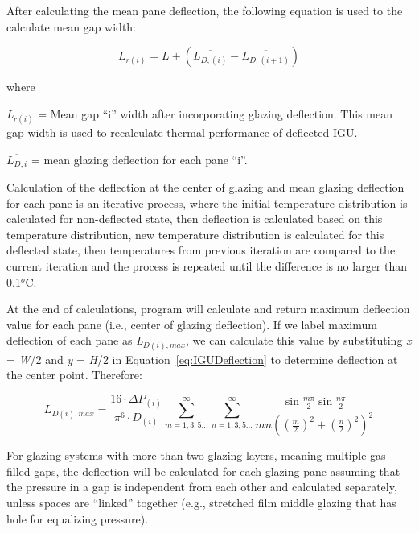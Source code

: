 After calculating the mean pane deflection, the following equation is used to the calculate mean gap width:

\begin{equation}
{L_{r\left( i \right)}} = L + \left( {\overline {{L_{D,\left( i \right)}}}  - \overline {{L_{D,\left( {i + 1} \right)}}} } \right)
\label{eq:IGUMeanPaneDeflection}
\end{equation}

where

\emph{L\(_{r(i)}\)} = Mean gap ``i'' width after incorporating glazing deflection. This mean gap width is used to recalculate thermal performance of deflected IGU.

\(\overline {{L_{D,i}}}\) = mean glazing deflection for each pane ``i''.

Calculation of the deflection at the center of glazing and mean glazing deflection for each pane is an iterative process, where the initial temperature distribution is calculated for non-deflected state, then deflection is calculated based on this temperature distribution, new temperature distribution is calculated for this deflected state, then temperatures from previous iteration are compared to the current iteration and the process is repeated until the difference is no larger than 0.1\(^{o}\)C.

At the end of calculations, program will calculate and return maximum deflection value for each pane (i.e., center of glazing deflection). If we label maximum deflection of each pane as \emph{L\(_{D(i),max}\)}, we can calculate this value by substituting \emph{x} = \emph{W}/2 and \emph{y} = \emph{H}/2 in Equation~\ref{eq:IGUDeflection} to determine deflection at the center point. Therefore:

\begin{equation}
{L_{D\left( i \right),max}} = \frac{{16\cdot \Delta {P_{\left( i \right)}}}}{{{\pi ^6}\cdot {D_{\left( i \right)}}}}\mathop \sum \limits_{m = 1,3,5 \ldots }^\infty  \mathop \sum \limits_{n = 1,3,5 \ldots }^\infty  \frac{{\sin \frac{{m\pi }}{2}\sin \frac{{n\pi }}{2}}}{{mn{{\left( {{{\left( {\frac{m}{2}} \right)}^2} + {{\left( {\frac{n}{2}} \right)}^2}} \right)}^2}}}
\label{eq:IGULDimaxDeflection}
\end{equation}

For glazing systems with more than two glazing layers, meaning multiple gas filled gaps, the deflection will be calculated for each glazing pane assuming that the pressure in a gap is independent from each other and calculated separately, unless spaces are ``linked'' together (e.g., stretched film middle glazing that has hole for equalizing pressure).


